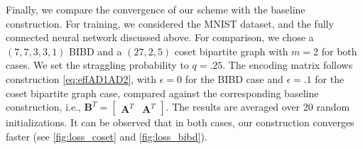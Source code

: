 \documentclass[journal,draftcls,onecolumn]{IEEEtran}
\theoremstyle{mystyle}
\newcommand{\bfA}{\mathbf{A}}
\newcommand{\bfB}{\mathbf{B}}
\newcommand{\aditya}[1]{\marginpar{+}{\bf Aditya's remark}: {\em #1}}
\begin{document}

Finally, we compare the convergence of our scheme with the baseline construction. For training, we considered the MNIST dataset, and the fully connected neural network discussed above.
%
For comparison, we chose a  $(7, 7, 3,3, 1)$ BIBD and a $(27, 2, 5)$ coset bipartite graph with $m = 2$ for both cases. We set the straggling probability to $q = .25$. The encoding matrix follows construction  \eqref{eq:effAD1AD2}, with $\epsilon  = 0$ for the BIBD case and $\epsilon  = .1$ for the coset bipartite graph case, compared against the corresponding baseline construction, i.e., $\bfB^T = \begin{bmatrix} \bfA^T & \bfA^T\end{bmatrix}$. The results are averaged over 20 random initializations. It can be observed that in both cases, our construction converges faster (see  \autoref{fig:loss_coset} and \autoref{fig:loss_bibd}).

\end{document}
